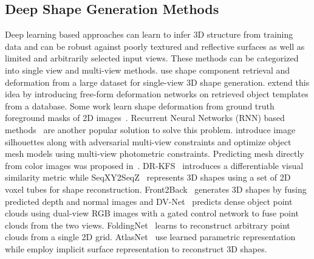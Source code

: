 \subsection{Deep Shape Generation Methods}
 Deep learning based approaches can learn to infer 3D structure from training data and can be robust against poorly textured and reflective surfaces as well as limited and arbitrarily selected input views. These methods can be categorized into single view and multi-view methods.
\cite{huang2015single, su2014estimating} use shape component retrieval and deformation from a large dataset for single-view 3D shape generation.
\cite{kurenkov2018deformnet} extend this idea by introducing free-form deformation networks on retrieved object templates from a database.
Some work learn shape deformation from ground truth foreground masks of 2D images~\cite{kar2015category,yan2016perspective,tulsiani2017multi}.
Recurrent Neural Networks (RNN) based methods~\cite{3dr2n2, kar2017lsm, mcrecon2017} are another popular solution to solve this problem.
\cite{mcrecon2017, lin2019photometric} introduce image silhouettes along with adversarial multi-view constraints and optimize object mesh models using multi-view photometric constraints.
Predicting mesh directly from color images was proposed in~\cite{wang2018pixel2mesh, wickramasinghe2019voxel2mesh,pan2019deep,wen2019pixel2mesh++, gkioxari2019meshrcnn, tang2019skeleton}.
DR-KFS~\cite{jin2019drkfs} introduces a differentiable visual similarity metric
while SeqXY2SeqZ~\cite{han2020seqxy2seqz} represents 3D shapes using a set of 2D voxel tubes for shape reconstruction.
Front2Back~\cite{yao2020front2back} generates 3D shapes by fusing predicted depth and normal images and
DV-Net~\cite{jia2020dv} predicts dense object point clouds using dual-view RGB images with a gated control network to fuse point clouds from the two views.
FoldingNet~\cite{yang2018foldingnet} learns to reconstruct arbitrary point clouds from a single 2D grid.
AtlasNet~\cite{groueix2018papier} use learned parametric representation
while \cite{mescheder2019occupancy,park2019deepsdf,liu2019learning,liu2019dist,murez2020atlas} employ implicit surface representation to reconstruct 3D shapes.

